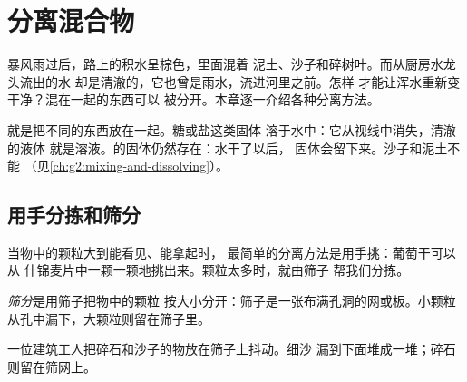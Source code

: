 \chapter{分离混合物}\label{ch:g3:separating-mixtures}

暴风雨过后，路上的积水呈棕色，里面混着
泥土、沙子和碎树叶。而从厨房水龙头流出的水
却是清澈的，它也曾是雨水，流进河里之前。怎样
才能让浑水重新变干净？混在一起的东西可以
被分开。本章逐一介绍各种分离方法。

\begin{recall}
就是把不同的东西放在一起。糖或盐这类固体
溶于水中：它从视线中消失，清澈的液体
就是溶液。的固体仍然存在：水干了以后，
固体会留下来。沙子和泥土不能
（见\cref{ch:g2:mixing-and-dissolving}）。
\end{recall}

\section{用手分拣和筛分}

当物中的颗粒大到能看见、能拿起时，
最简单的分离方法是用手挑：葡萄干可以从
什锦麦片中一颗一颗地挑出来。颗粒太多时，就由筛子
帮我们分拣。

\begin{definition}[筛分]\label{def:g3:separating-mixtures:sieve}
\emph{筛分}是用筛子把物中的颗粒
按大小分开：筛子是一张布满孔洞的网或板。小颗粒
从孔中漏下，大颗粒则留在筛子里。
\end{definition}

\begin{example}[碎石和沙子]\label{ex:g3:separating-mixtures:gravel}
一位建筑工人把碎石和沙子的物放在筛子上抖动。细沙
漏到下面堆成一堆；碎石则留在筛网上。
\end{example}

